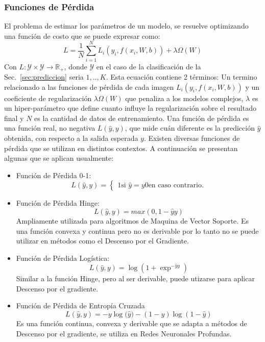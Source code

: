 \documentclass[a4paper,11pt,spanish]{book}
\begin{document}
	\subsubsection{Funciones de Pérdida}
	  El problema de estimar los parámetros de un modelo, se resuelve optimizando una función de costo que se puede expresar como:
          \begin{equation}
	    L = \frac{1}{N}\sum_{i=1}^{N} L_i(y_i, f(x_i, W, b)) + \lambda \Omega(W)
          \end{equation}
          Con $L:\mathcal{Y}\times \mathcal{Y}\rightarrow\mathbb{R}_+$, donde $\mathcal{Y}$ en el caso de la clasificación de la Sec.~\ref{sec:prediccion} seria ${1,..,K}$.
          Esta ecuación contiene 2 términos: Un termino relacionado a las funciones de pérdida de cada imagen $L_i(y_i, f(x_i, W, b))$
          y un coeficiente de regularización $\lambda \Omega(W)$ que penaliza a los modelos complejos, $\lambda$ es un hiper-parámetro que define cuanto influye la regularización
          sobre el resultado final y $N$ es la cantidad de datos de entrenamiento.
	  Una función de pérdida es una función real, no negativa $L({\widehat y}, y)$, que mide cuán diferente es la predicción ${\widehat y}$ obtenida, con respecto a la
	  salida esperada $y$. Existen diversas funciones de pérdida que se utilizan en distintos contextos. A continuación se presentan algunas que se aplican usualmente:
	  \begin{itemize}
	    \item Función de Pérdida 0-1:
	      \begin{equation*}
		L({\widehat y}, y) =  \begin{cases}
					    1 \text{si ${\widehat y} = y$}
					    0 \text{en caso contrario.}
		                      \end{cases}
	      \end{equation*}
	    \item Función de Pérdida Hinge:
	      \begin{equation*}
		L({\widehat y}, y) =  max(0, 1 - {\widehat y}y)
	      \end{equation*}
	      Ampliamente utilizada para algoritmos de Maquina de Vector Soporte.
	      Es una función convexa y continua pero no es derivable por lo tanto no se puede utilizar en métodos como el Descenso por el Gradiente.
	    \item Función de Pérdida Logística:
	      \begin{equation*}
		L({\widehat y}, y) =  {\log(1+ {\exp^{-{\widehat y}y}})}
	      \end{equation*}
	      Similar a la función Hinge, pero al ser derivable, puede utizarse para aplicar Descenso por el gradiente.
	    \item Función de Pérdida de Entropía Cruzada
	      \begin{equation*}
		L({\widehat y}, y) = -y{\log({\widehat y}}) - (1-y) {\log(1-{\widehat y})}
	      \end{equation*}
	      Es una función continua, convexa y derivable que se adapta a métodos de Descenso por el gradiente, se utiliza en Redes Neuronales Profundas.

	  \end{itemize}
\end{document}

